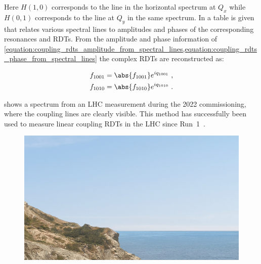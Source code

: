 Here \(H(1,0)\) corresponds to the line in the horizontal spectrum at \(Q_x\) while \(H(0, 1)\) corresponds to the line at \(Q_y\) in the same spectrum.
In \cite{PRAB:Franchi:First_Simultaneous} a table is given that relates various spectral lines to amplitudes and phases of the corresponding resonances and RDTs.
From the amplitude and phase information of \cref{equation:coupling_rdts_amplitude_from_spectral_lines,equation:coupling_rdts_phase_from_spectral_lines} the complex RDTs are reconstructed as:

\begin{equation}
  \begin{aligned}
    f_{1001} &= \abs{f_{1001}} e^{i q_{1001}}  \text{ ,}  \\
    f_{1010} &= \abs{f_{1010}} e^{i q_{1010}}  \text{ .}  \\
  \end{aligned}
  \label{equation:complex_coupling_rdts_from_phase_and_amplitude}
\end{equation}

 shows a spectrum from an LHC measurement during the \num{2022} commissioning, where the coupling lines are clearly visible.
This method has successfully been used to measure linear coupling RDTs in the LHC since Run~\num{1}~\cite{PRAB:Benedikt:Driving_Term_Experiments_CERN,IPAC:Persson:Automatic_Coupling_Correction_LHC_Injection_Oscillations,IPAC:Miyamoto:Measurement_Coupling_RDTs_LHC_AC_Dipole}.

\begin{figure}[!h]
  \centering
  \includegraphics*[width=0.9\linewidth]{Figures/placeholder.png}
  \caption{}
  \label{figure:measurement_spectrum}
\end{figure}

